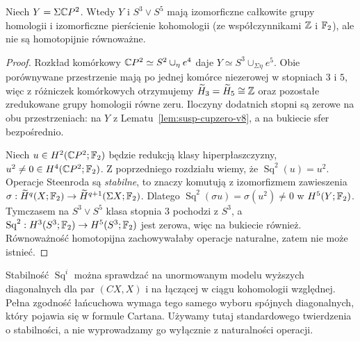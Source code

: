 \begin{twierdzenie}
\label{thm:sigma-cp2-v8}
Niech $Y=\Sigma\mathbb{C} P^2$. Wtedy $Y$ i $S^3\vee S^5$
mają izomorficzne całkowite grupy homologii i izomorficzne
pierścienie kohomologii (ze współczynnikami $\mathbb{Z}$ i $\mathbb{F}_2$),
ale nie są homotopijnie równoważne.
\end{twierdzenie}
\begin{proof}
Rozkład komórkowy $\mathbb{C} P^2\simeq S^2\cup_\eta e^4$
daje $Y\simeq S^3\cup_{\Sigma\eta}e^5$.
Obie porównywane przestrzenie mają po jednej komórce
niezerowej w stopniach $3$ i $5$, więc z różniczek
komórkowych otrzymujemy
$\widetilde H_3=\widetilde H_5\cong\mathbb{Z}$ oraz pozostałe
zredukowane grupy homologii równe zeru.
Iloczyny dodatnich stopni są zerowe na obu przestrzeniach:
na $Y$ z Lematu~\ref{lem:susp-cupzero-v8}, a na bukiecie
sfer bezpośrednio.

Niech $u\in H^2(\mathbb{C} P^2;\mathbb{F}_2)$ będzie redukcją klasy
hiperpłaszczyzny, $u^2\ne0\in H^4(\mathbb{C} P^2;\mathbb{F}_2)$.
Z poprzedniego rozdziału wiemy, że
$\operatorname{Sq}^2(u)=u^2$.
Operacje Steenroda są \emph{stabilne}, to znaczy
komutują z izomorfizmem zawieszenia
$\sigma:\widetilde H^q(X;\mathbb{F}_2)\to
\widetilde H^{q+1}(\Sigma X;\mathbb{F}_2)$.
Dlatego
$\operatorname{Sq}^2(\sigma u)=\sigma(u^2)\ne0$
w $H^5(Y;\mathbb{F}_2)$.
Tymczasem na $S^3\vee S^5$ klasa stopnia $3$
pochodzi z $S^3$, a
$\operatorname{Sq}^2:H^3(S^3;\mathbb{F}_2)\to H^5(S^3;\mathbb{F}_2)$
jest zerowa, więc na bukiecie również.
Równoważność homotopijna zachowywałaby operacje
naturalne, zatem nie może istnieć.
\end{proof}

\begin{uwaga}
Stabilność $\operatorname{Sq}^i$ można sprawdzać na
unormowanym modelu wyższych diagonalnych dla par
$(CX,X)$ i na łączącej w ciągu kohomologii względnej.
Pełna zgodność łańcuchowa wymaga tego samego wyboru
spójnych diagonalnych, który pojawia się w formule Cartana.
Używamy tutaj standardowego twierdzenia o stabilności,
a nie wyprowadzamy go wyłącznie z naturalności operacji.
\end{uwaga}

